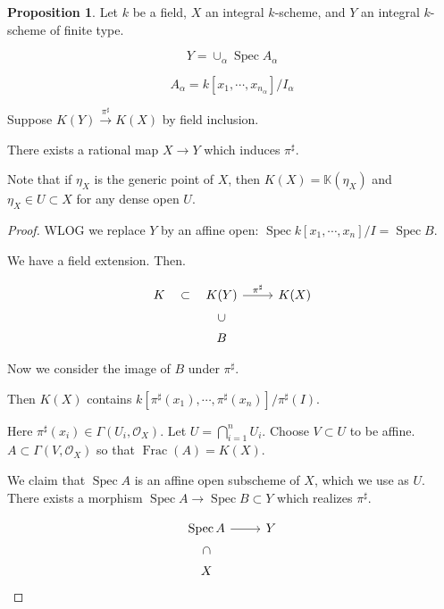 \documentclass{article}
\theoremstyle{definition}
\newtheorem{proposition}[theorem]{Proposition}
\begin{document}
    \begin{proposition}
        Let \(k\) be a field, \(X\) an integral \(k\)-scheme, and \(Y\) an integral \(k\)-scheme of finite type.

        \[
            Y = \cup_\alpha \operatorname{Spec} A_\alpha
        \] 

        \[
            A_\alpha = k[x_1 , \cdots , x_{n_\alpha}] / I_\alpha
        \]

        Suppose \(K(Y) \xrightarrow{\pi^\sharp} K(X)\) by field inclusion.

        There exists a rational map \(X \to Y\) which induces \(\pi^\sharp\).

        Note that if \(\eta_X\) is the generic point of \(X\), then \(K(X) = \mathbb{K} (\eta_X)\) and \(\eta_X \in U \subset X\) for any dense open \(U\).
    \end{proposition}

    \begin{proof}
        WLOG we replace \(Y\) by an affine open: \(\operatorname{Spec} k[x_1 , \cdots , x_n] / I = \operatorname{Spec} B\).

        We have a field extension. Then.
        
        \[
            \begin{tikzcd}
                K \ar[r,"\subset", phantom] & K(Y) \ar[r,"\pi^\sharp"] & K(X) \\ & B \ar[u,"\subset",phantom, sloped]
            \end{tikzcd}
        \]

        Now we consider the image of \(B\) under \(\pi^\sharp\). 
        
        Then \(K(X)\) contains \(k[\pi^\sharp(x_1) , \cdots , \pi^\sharp(x_n)] / \pi^\sharp(I)\).

        Here \(\pi^\sharp (x_i) \in \Gamma(U_i , \mathcal{O}_X)\). Let \(U = \bigcap_{i=1}^n U_i\). Choose \(V \subset U\) to be affine. \(A \subset \Gamma(V, \mathcal{O}_X)\) so that \(\operatorname{Frac} (A) = K(X)\).

        We claim that \(\operatorname{Spec} A\) is an affine open subscheme of \(X\), which we use as \(U\). There exists a morphism \(\operatorname{Spec}  A \to \operatorname{Spec} B \subset Y\) which realizes \(\pi^\sharp\).

        \[
            \begin{tikzcd}
                \operatorname{Spec} A \ar[d, "\subset", phantom, sloped] \ar[r] & Y \\ X
            \end{tikzcd}
        \]

    \end{proof}
\end{document}
